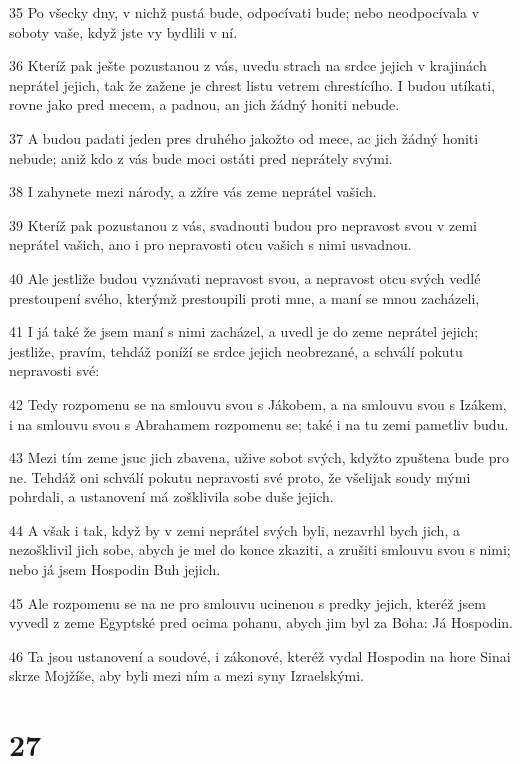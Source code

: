 \par 35 Po všecky dny, v nichž pustá bude, odpocívati bude; nebo neodpocívala v soboty vaše, když jste vy bydlili v ní.
\par 36 Kteríž pak ješte pozustanou z vás, uvedu strach na srdce jejich v krajinách neprátel jejich, tak že zažene je chrest listu vetrem chrestícího. I budou utíkati, rovne jako pred mecem, a padnou, an jich žádný honiti nebude.
\par 37 A budou padati jeden pres druhého jakožto od mece, ac jich žádný honiti nebude; aniž kdo z vás bude moci ostáti pred neprátely svými.
\par 38 I zahynete mezi národy, a zžíre vás zeme neprátel vašich.
\par 39 Kteríž pak pozustanou z vás, svadnouti budou pro nepravost svou v zemi neprátel vašich, ano i pro nepravosti otcu vašich s nimi usvadnou.
\par 40 Ale jestliže budou vyznávati nepravost svou, a nepravost otcu svých vedlé prestoupení svého, kterýmž prestoupili proti mne, a maní se mnou zacházeli,
\par 41 I já také že jsem maní s nimi zacházel, a uvedl je do zeme neprátel jejich; jestliže, pravím, tehdáž poníží se srdce jejich neobrezané, a schválí pokutu nepravosti své:
\par 42 Tedy rozpomenu se na smlouvu svou s Jákobem, a na smlouvu svou s Izákem, i na smlouvu svou s Abrahamem rozpomenu se; také i na tu zemi pametliv budu.
\par 43 Mezi tím zeme jsuc jich zbavena, užive sobot svých, kdyžto zpuštena bude pro ne. Tehdáž oni schválí pokutu nepravosti své proto, že všelijak soudy mými pohrdali, a ustanovení má zošklivila sobe duše jejich.
\par 44 A však i tak, když by v zemi neprátel svých byli, nezavrhl bych jich, a nezošklivil jich sobe, abych je mel do konce zkaziti, a zrušiti smlouvu svou s nimi; nebo já jsem Hospodin Buh jejich.
\par 45 Ale rozpomenu se na ne pro smlouvu ucinenou s predky jejich, kteréž jsem vyvedl z zeme Egyptské pred ocima pohanu, abych jim byl za Boha: Já Hospodin.
\par 46 Ta jsou ustanovení a soudové, i zákonové, kteréž vydal Hospodin na hore Sinai skrze Mojžíše, aby byli mezi ním a mezi syny Izraelskými.

\chapter{27}


